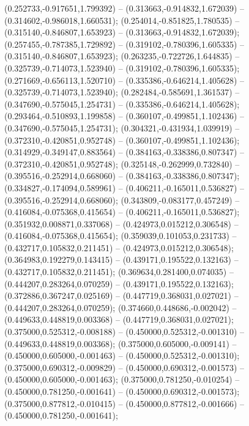  (0.252733,-0.917651,1.799392) -- (0.313663,-0.914832,1.672039) -- (0.314602,-0.986018,1.660531);
 (0.254014,-0.851825,1.780535) -- (0.315140,-0.846807,1.653923) -- (0.313663,-0.914832,1.672039);
 (0.257455,-0.787385,1.729892) -- (0.319102,-0.780396,1.605335) -- (0.315140,-0.846807,1.653923);
 (0.263235,-0.722726,1.644835) -- (0.325739,-0.714073,1.523940) -- (0.319102,-0.780396,1.605335);
 (0.271669,-0.656113,1.520710) -- (0.335386,-0.646214,1.405628) -- (0.325739,-0.714073,1.523940);
 (0.282484,-0.585691,1.361537) -- (0.347690,-0.575045,1.254731) -- (0.335386,-0.646214,1.405628);
 (0.293464,-0.510893,1.199858) -- (0.360107,-0.499851,1.102436) -- (0.347690,-0.575045,1.254731);
 (0.304321,-0.431934,1.039919) -- (0.372310,-0.420851,0.952748) -- (0.360107,-0.499851,1.102436);
 (0.314929,-0.349147,0.883564) -- (0.384163,-0.338386,0.807347) -- (0.372310,-0.420851,0.952748);
 (0.325148,-0.262999,0.732840) -- (0.395516,-0.252914,0.668060) -- (0.384163,-0.338386,0.807347);
 (0.334827,-0.174094,0.589961) -- (0.406211,-0.165011,0.536827) -- (0.395516,-0.252914,0.668060);
 (0.343809,-0.083177,0.457249) -- (0.416084,-0.075368,0.415654) -- (0.406211,-0.165011,0.536827);
 (0.351932,0.008871,0.337068) -- (0.424973,0.015212,0.306548) -- (0.416084,-0.075368,0.415654);
 (0.359039,0.101053,0.231733) -- (0.432717,0.105832,0.211451) -- (0.424973,0.015212,0.306548);
 (0.364983,0.192279,0.143415) -- (0.439171,0.195522,0.132163) -- (0.432717,0.105832,0.211451);
 (0.369634,0.281400,0.074035) -- (0.444207,0.283264,0.070259) -- (0.439171,0.195522,0.132163);
 (0.372886,0.367247,0.025169) -- (0.447719,0.368031,0.027021) -- (0.444207,0.283264,0.070259);
 (0.374660,0.448686,-0.002042) -- (0.449633,0.448819,0.003368) -- (0.447719,0.368031,0.027021);
 (0.375000,0.525312,-0.008188) -- (0.450000,0.525312,-0.001310) -- (0.449633,0.448819,0.003368);
 (0.375000,0.605000,-0.009141) -- (0.450000,0.605000,-0.001463) -- (0.450000,0.525312,-0.001310);
 (0.375000,0.690312,-0.009829) -- (0.450000,0.690312,-0.001573) -- (0.450000,0.605000,-0.001463);
 (0.375000,0.781250,-0.010254) -- (0.450000,0.781250,-0.001641) -- (0.450000,0.690312,-0.001573);
 (0.375000,0.877812,-0.010415) -- (0.450000,0.877812,-0.001666) -- (0.450000,0.781250,-0.001641);
